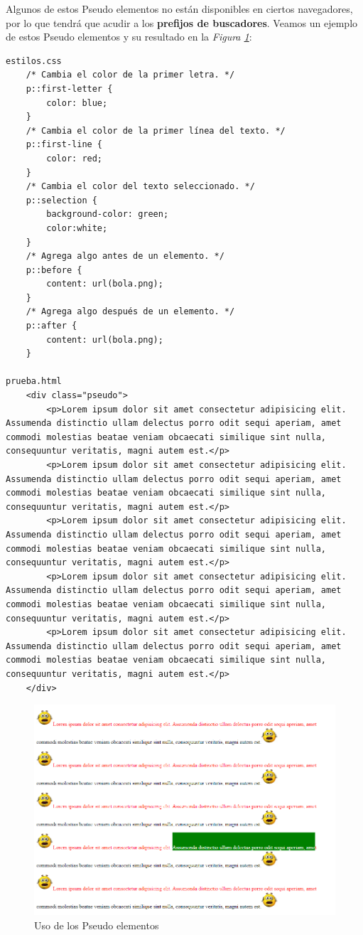 Algunos de estos Pseudo elementos no están disponibles en ciertos navegadores, por lo que tendrá que acudir a los \textbf{prefijos de buscadores}. Veamos un ejemplo de estos Pseudo elementos y su resultado en la \textit{Figura \ref{fig: 39}}:
\begin{lstlisting}
estilos.css
    /* Cambia el color de la primer letra. */
    p::first-letter {
        color: blue;
    }
    /* Cambia el color de la primer línea del texto. */
    p::first-line {
        color: red;
    }
    /* Cambia el color del texto seleccionado. */
    p::selection {
        background-color: green;
        color:white;
    }
    /* Agrega algo antes de un elemento. */
    p::before {
        content: url(bola.png);
    }
    /* Agrega algo después de un elemento. */
    p::after {
        content: url(bola.png);
    }

prueba.html
    <div class="pseudo">
        <p>Lorem ipsum dolor sit amet consectetur adipisicing elit. Assumenda distinctio ullam delectus porro odit sequi aperiam, amet commodi molestias beatae veniam obcaecati similique sint nulla, consequuntur veritatis, magni autem est.</p>
        <p>Lorem ipsum dolor sit amet consectetur adipisicing elit. Assumenda distinctio ullam delectus porro odit sequi aperiam, amet commodi molestias beatae veniam obcaecati similique sint nulla, consequuntur veritatis, magni autem est.</p>
        <p>Lorem ipsum dolor sit amet consectetur adipisicing elit. Assumenda distinctio ullam delectus porro odit sequi aperiam, amet commodi molestias beatae veniam obcaecati similique sint nulla, consequuntur veritatis, magni autem est.</p>
        <p>Lorem ipsum dolor sit amet consectetur adipisicing elit. Assumenda distinctio ullam delectus porro odit sequi aperiam, amet commodi molestias beatae veniam obcaecati similique sint nulla, consequuntur veritatis, magni autem est.</p>
        <p>Lorem ipsum dolor sit amet consectetur adipisicing elit. Assumenda distinctio ullam delectus porro odit sequi aperiam, amet commodi molestias beatae veniam obcaecati similique sint nulla, consequuntur veritatis, magni autem est.</p>
    </div>
\end{lstlisting}
\begin{figure}[H]
    \centering
    \caption{Uso de los Pseudo elementos}
    \label{fig: 39}
    \includegraphics[width=12cm]{ss/pseudo-elementos.png}
\end{figure}

